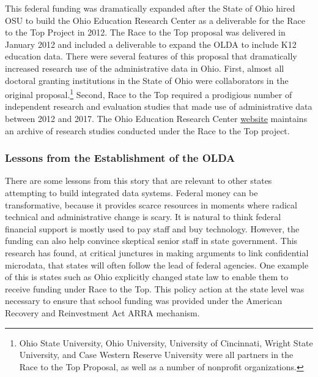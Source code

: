 This federal funding was dramatically expanded after the State of Ohio hired OSU to build the Ohio Education Research Center as a deliverable for the Race to the Top Project in 2012. The Race to the Top proposal was delivered in January 2012 and included a deliverable to expand the OLDA to include K12 education data. There were several features of this proposal that dramatically increased research use of the administrative data in Ohio. First, almost all doctoral granting institutions in the State of Ohio were collaborators in the original proposal.\footnote{Ohio State University, Ohio University, University of Cincinnati, Wright State University, and Case Western Reserve University were all partners in the Race to the Top Proposal, as well as a number of nonprofit organizations.} Second, Race to the Top required a prodigious number of independent research and evaluation studies that made use of administrative data between 2012 and 2017. The Ohio Education Research Center \href{www.oerc.osu.edu}{website} maintains an archive of research studies conducted under the Race to the Top project.

\hypertarget{lessons-from-the-establishment-of-the-olda}{%
\subsubsection*{Lessons from the Establishment of the OLDA}\label{lessons-from-the-establishment-of-the-olda}}

There are some lessons from this story that are relevant to other states attempting to build integrated data systems. Federal money can be transformative, because it provides scarce resources in moments where radical technical and administrative change is scary. It is natural to think federal financial support is mostly used to pay staff and buy technology. However, the funding can also help convince skeptical senior staff in state government. This research has found, at critical junctures in making arguments to link confidential microdata, that states will often follow the lead of federal agencies. One example of this is states such as Ohio explicitly changed state law to enable them to receive funding under Race to the Top. This policy action at the state level was necessary to ensure that school funding was provided under the American Recovery and Reinvestment Act ARRA mechanism.

